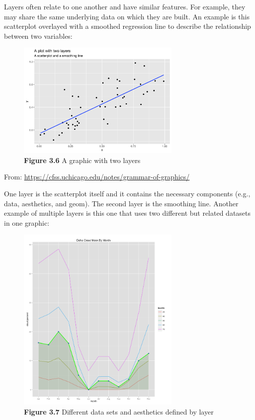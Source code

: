 \documentclass[
]{book}
\begin{document}
Layers often relate to one another and have similar features. For example, they may share the same underlying data on which they are built. An example is this scatterplot overlayed with a smoothed regression line to describe the relationship between two variables:

\begin{figure}
\centering
\includegraphics[width=0.7\textwidth,height=\textheight]{Images/layers.png}
\caption{\textbf{Figure 3.6} A graphic with two layers}
\end{figure}

From: \url{https://cfss.uchicago.edu/notes/grammar-of-graphics/}

One layer is the scatterplot itself and it contains the necessary components (e.g., data, aesthetics, and geom). The second layer is the smoothing line. Another example of multiple layers is this one that uses two different but related datasets in one graphic:

\begin{figure}
\centering
\includegraphics[width=0.7\textwidth,height=\textheight]{Images/complexlayer.png}
\caption{\textbf{Figure 3.7} Different data sets and aesthetics defined by layer}
\end{figure}
\end{document}
